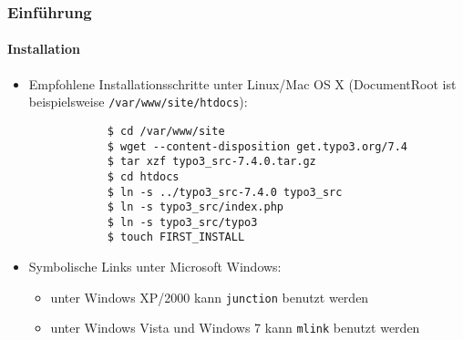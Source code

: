 \begin{frame}[fragile]
	\frametitle{Einführung}
	\framesubtitle{Installation}

	\begin{itemize}
		\item Empfohlene Installationsschritte unter Linux/Mac OS X\newline
			(DocumentRoot ist beispielsweise \texttt{/var/www/site/htdocs}):
		\begin{lstlisting}
			$ cd /var/www/site
			$ wget --content-disposition get.typo3.org/7.4
			$ tar xzf typo3_src-7.4.0.tar.gz
			$ cd htdocs
			$ ln -s ../typo3_src-7.4.0 typo3_src
			$ ln -s typo3_src/index.php
			$ ln -s typo3_src/typo3
			$ touch FIRST_INSTALL
		\end{lstlisting}

		\item Symbolische Links unter Microsoft Windows:

			\begin{itemize}
				\item unter Windows XP/2000 kann \texttt{junction} benutzt werden
				\item unter Windows Vista und Windows 7 kann \texttt{mlink} benutzt werden
			\end{itemize}

	\end{itemize}
\end{frame}

